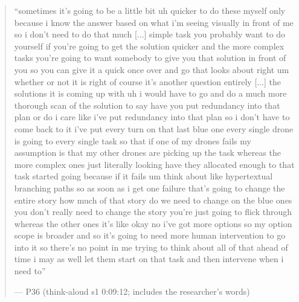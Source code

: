 \begin{quote}\small
``sometimes it's going to be a little bit uh quicker to do these myself only because i know the answer based on what i'm seeing visually in front of me so i don't need to do that much [...] simple task you probably want to do yourself if you're going to get the solution quicker and the more complex tasks you're going to want somebody to give you that solution in front of you so you can give it a quick once over and go that looks about right um whether or not it is right of course it's another question entirely [...] the solutions it is coming up with uh i would have to go and do a much more thorough scan of the solution to say have you put redundancy into that plan or do i care like i've put redundancy into that plan so i don't have to come back to it i've put every turn on that last blue one every single drone is going to every single task so that if one of my drones fails my assumption is that my other drones are picking up the task whereas the more complex ones just literally looking have they allocated enough to that task started going because if it fails um think about like hypertextual branching paths so as soon as i get one failure that's going to change the entire story how much of that story do we need to change on the blue ones you don't really need to change the story you're just going to flick through whereas the other ones it's like okay no i've got more options so my option scope is broader and so it's going to need more human intervention to go into it so there's no point in me trying to think about all of that ahead of time i may as well let them start on that task and then intervene when i need to''\par\hfill--- P36 (think-aloud s1 0:09:12; includes the researcher's words)
\end{quote}

